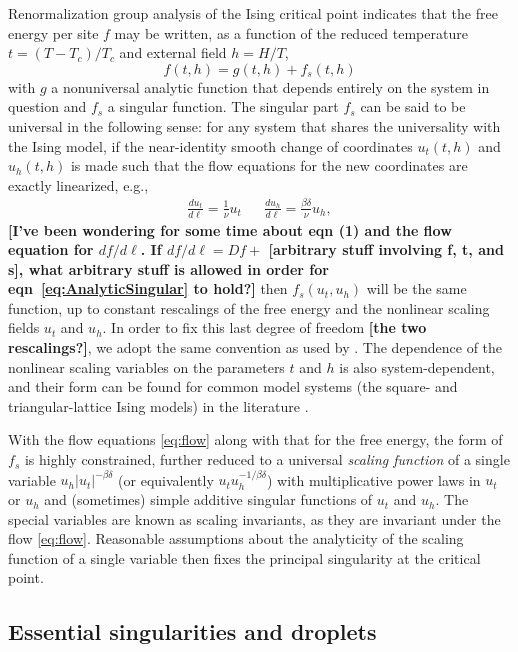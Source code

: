 \documentclass[
  aps,
  prb,
  reprint,
  longbibliography,
  floatfix
]{revtex4-2}
\begin{document}
Renormalization group analysis of the Ising critical point indicates that the free energy per site $f$ may be written, as a function of the reduced temperature $t=(T-T_c)/T_c$ and external field $h=H/T$,
\begin{equation}
\label{eq:AnalyticSingular}
  f(t,h)=g(t,h)+f_s(t,h)
\end{equation}
with $g$ a nonuniversal analytic function that depends entirely on the system
in question and $f_s$ a singular function. The singular part $f_s$ can be said
to be universal in the following sense: for any system that shares the
universality with the Ising model, if the near-identity smooth change of coordinates
$u_t(t, h)$ and $u_h(t,h)$ is made such that the flow equations for the new
coordinates are exactly linearized, e.g.,
\begin{align} \label{eq:flow}
  \frac{du_t}{d\ell}=\frac1\nu u_t
  &&
  \frac{du_h}{d\ell}=\frac{\beta\delta}\nu u_h,
\end{align}
{\bf [I've been wondering for some time about eqn (1) and the flow equation for $df/d\ell$. If $df/d\ell = D f +$ [arbitrary stuff involving f, t, and s], what arbitrary stuff is allowed in order for eqn~\ref{eq:AnalyticSingular} to hold?] }
then $f_s(u_t, u_h)$ will be the same function, up to constant rescalings of
the free energy and the nonlinear scaling fields $u_t$ and $u_h$. In order to
fix this last degree of freedom {\bf [the two rescalings?]}, we adopt the same convention as used by
\cite{Fonseca_2003_Ising}. The dependence of the nonlinear scaling variables on
the parameters $t$ and $h$ is also system-dependent, and their form can be
found for common model systems (the square- and triangular-lattice Ising
models) in the literature \cite{Clement_2019_Respect}.

With the flow equations \eqref{eq:flow} along with that for the free energy,
the form of $f_s$ is highly constrained, further reduced to a universal
\emph{scaling function} of a single variable $u_h|u_t|^{-\beta\delta}$ (or equivalently
$u_tu_h^{-1/\beta\delta}$) with multiplicative power laws in $u_t$ or $u_h$ and
(sometimes) simple additive singular functions of $u_t$ and $u_h$. The special
variables are known as scaling invariants, as they are invariant under the flow
\eqref{eq:flow}. Reasonable assumptions about the analyticity of the scaling
function of a single variable then fixes the principal singularity at the
critical point.

\subsection{Essential singularities and droplets}
\end{document}
